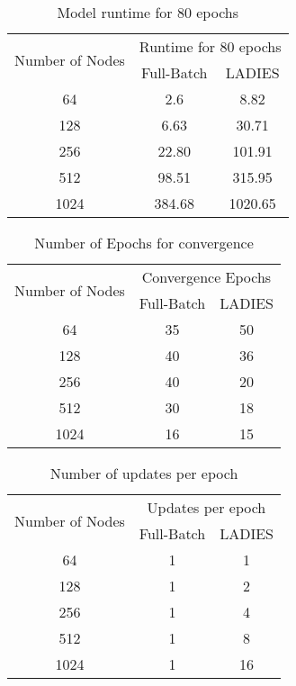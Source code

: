 \begin{table}[H]
    \centering
    \begin{tabular}{|c|c|c|}
        \hline
        \multirow{2}{*}{Number of Nodes} & \multicolumn{2}{c|}{Runtime for 80 epochs} \\ \cline{2-3} & Full-Batch & LADIES  \\ \hline
        64              & 2.6       & 8.82    \\ \hline
        128             & 6.63       & 30.71   \\ \hline
        256             & 22.80      & 101.91  \\ \hline
        512             & 98.51      & 315.95  \\ \hline
        1024            & 384.68     & 1020.65 \\ \hline
    \end{tabular}
    \caption{Model runtime for 80 epochs}
    \label{tab:model_80}
\end{table}

\begin{table}[H]
    \centering
    \begin{tabular}{|c|c|c|}
        \hline
        \multirow{2}{*}{Number of Nodes} & \multicolumn{2}{c|}{Convergence Epochs} \\ \cline{2-3} 
             & Full-Batch & LADIES \\ \hline
        64   & 35         & 50     \\ \hline
        128  & 40         & 36     \\ \hline
        256  & 40         & 20     \\ \hline
        512  & 30         & 18     \\ \hline
        1024 & 16         & 15     \\ \hline
    \end{tabular}
    \caption{Number of Epochs for convergence}
    \label{tab:converge_epoch}
\end{table}

\begin{table}[H]
    \centering
    \begin{tabular}{|c|c|c|}
        \hline
        \multirow{2}{*}{Number of Nodes} & \multicolumn{2}{c|}{Updates per epoch} \\ \cline{2-3} & Full-Batch & LADIES \\ \hline
        64              & 1          & 1      \\ \hline
        128             & 1          & 2      \\ \hline
        256             & 1          & 4      \\ \hline
        512             & 1          & 8      \\ \hline
        1024            & 1          & 16     \\ \hline
    \end{tabular}
    \caption{Number of updates per epoch}
    \label{tab:update_epoch}
\end{table}

